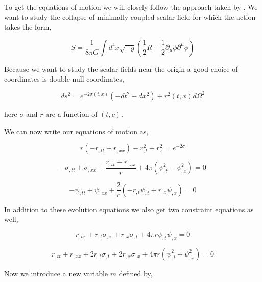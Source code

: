 To get the equations of motion we will closely follow the approach taken by \citep{Guo:2018yyt}. We want to study the collapse of minimally coupled scalar field for which the action takes the form,

\begin{equation}
    S=\frac{1}{8 \pi G} \int d^{4} x \sqrt{-g}\left(\frac{1}{2} R-\frac{1}{2} \partial_{\mu} \phi \partial^{\mu} \phi\right)
\end{equation}

Because we want to study the scalar fields near the origin a good choice of coordinates is double-null coordinates,

\begin{equation}
    ds^2=e^{-2 \sigma(t, x)}\left(-d t^{2}+d x^{2}\right)+r^{2}(t, x) d \Omega^{2}
\end{equation}

here $\sigma$ and $r$ are a function of $(t,c)$.

We can now write our equations of motion as,


\begin{equation}
    r\left(-r_{, t t}+r_{, x x}\right)-r_{, t}^{2}+r_{x}^{2}=e^{-2 \sigma}
\end{equation}

\begin{equation}
    -\sigma_{, t t}+\sigma_{,x x}+\frac{r_{, t t}-r_{,x x}}{r}+4 \pi\left(\psi_{, t}^{2}-\psi_{, x}^{2}\right)=0
\end{equation}

\begin{equation}
    -\psi_{, t t}+\psi_{,x x}+\frac{2}{r}\left(-r_{, t} \psi_{, t}+r_{, x} \psi_{, x}\right)=0
\end{equation}

In addition to these evolution equations we also get two constraint equations as well,


\begin{equation}
    r_{, t x}+r_{, t} \sigma_{, x}+r_{, x} \sigma_{, t}+4 \pi r \psi_{, t} \psi_{, x}=0
    \label{eqn:constraint_1}
\end{equation}

\begin{equation}
    r_{, t t}+r_{, x x}+2 r_{, t} \sigma_{, t}+2 r_{, x} \sigma_{, x}+4 \pi r\left(\psi_{, t}^{2}+\psi_{, x}^{2}\right)=0
    \label{eqn:constraint_2}
\end{equation}


Now we introduce a new variable $m$ defined by,


